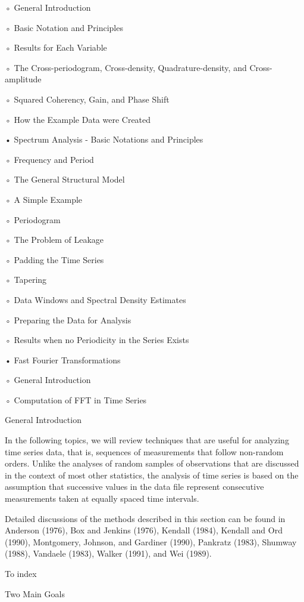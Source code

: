 ◦
General Introduction

◦
Basic Notation and Principles

◦
Results for Each Variable

◦
The Cross-periodogram, Cross-density, Quadrature-density, and Cross-amplitude

◦
Squared Coherency, Gain, and Phase Shift

◦
How the Example Data were Created

•
Spectrum Analysis - Basic Notations and Principles

◦
Frequency and Period

◦
The General Structural Model

◦
A Simple Example

◦
Periodogram

◦
The Problem of Leakage

◦
Padding the Time Series

◦
Tapering

◦
Data Windows and Spectral Density Estimates

◦
Preparing the Data for Analysis

◦
Results when no Periodicity in the Series Exists

•
Fast Fourier Transformations

◦
General Introduction

◦
Computation of FFT in Time Series


General Introduction

In the following topics, we will review techniques that are useful for analyzing time series data, that is, sequences of measurements that follow non-random orders. Unlike the analyses of random samples of observations that are discussed in the context of most other statistics, the analysis of time series is based on the assumption that successive values in the data file represent consecutive measurements taken at equally spaced time intervals.

Detailed discussions of the methods described in this section can be found in Anderson (1976), Box and Jenkins (1976), Kendall (1984), Kendall and Ord (1990), Montgomery, Johnson, and Gardiner (1990), Pankratz (1983), Shumway (1988), Vandaele (1983), Walker (1991), and Wei (1989).







To index
 

 

Two Main Goals

